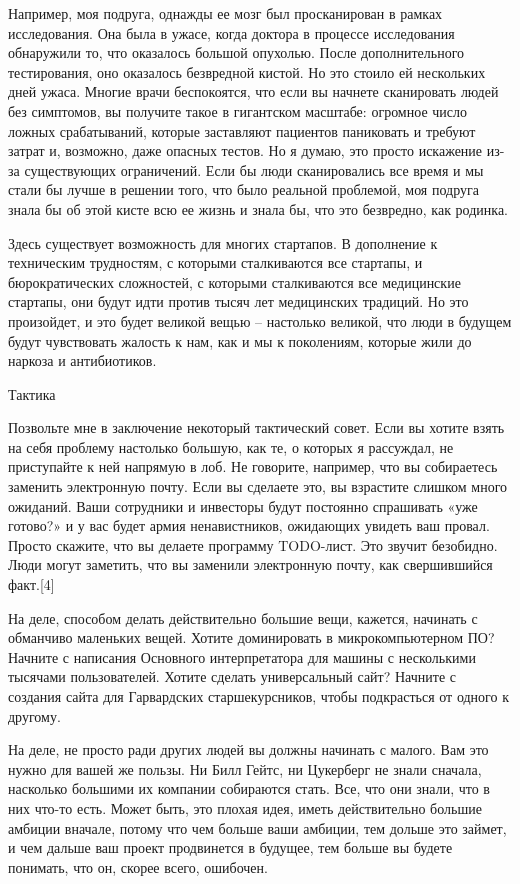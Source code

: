 \documentclass[ebook,12pt,oneside,openany]{memoir}
\begin{document}
Например, моя подруга, однажды ее мозг был просканирован в рамках
исследования. Она была в ужасе, когда доктора в процессе исследования
обнаружили то, что оказалось большой опухолью. После дополнительного
тестирования, оно оказалось безвредной кистой. Но это стоило ей
нескольких дней ужаса. Многие врачи беспокоятся, что если вы начнете
сканировать людей без симптомов, вы получите такое в гигантском
масштабе: огромное число ложных срабатываний, которые заставляют
пациентов паниковать и требуют затрат и, возможно, даже опасных
тестов. Но я думаю, это просто искажение из-за существующих
ограничений. Если бы люди сканировались все время и мы стали бы лучше
в решении того, что было реальной проблемой, моя подруга знала бы об
этой кисте всю ее жизнь и знала бы, что это безвредно, как родинка.

Здесь существует возможность для многих стартапов. В дополнение к
техническим трудностям, с которыми сталкиваются все стартапы, и
бюрократических сложностей, с которыми сталкиваются все медицинские
стартапы, они будут идти против тысяч лет медицинских традиций. Но это
произойдет, и это будет великой вещью – настолько великой, что люди в
будущем будут чувствовать жалость к нам, как и мы к поколениям,
которые жили до наркоза и антибиотиков.

Тактика

Позвольте мне в заключение некоторый тактический совет. Если вы хотите
взять на себя проблему настолько большую, как те, о которых я
рассуждал, не приступайте к ней напрямую в лоб. Не говорите, например,
что вы собираетесь заменить электронную почту. Если вы сделаете это,
вы взрастите слишком много ожиданий. Ваши сотрудники и инвесторы будут
постоянно спрашивать «уже готово?» и у вас будет армия ненавистников,
ожидающих увидеть ваш провал. Просто скажите, что вы делаете программу
TODO-лист. Это звучит безобидно. Люди могут заметить, что вы заменили
электронную почту, как свершившийся факт.[4]

На деле, способом делать действительно большие вещи, кажется, начинать
с обманчиво маленьких вещей. Хотите доминировать в микрокомпьютерном
ПО? Начните с написания Основного интерпретатора для машины с
несколькими тысячами пользователей. Хотите сделать универсальный сайт?
Начните с создания сайта для Гарвардских старшекурсников, чтобы
подкрасться от одного к другому.

На деле, не просто ради других людей вы должны начинать с малого. Вам
это нужно для вашей же пользы. Ни Билл Гейтс, ни Цукерберг не знали
сначала, насколько большими их компании собираются стать. Все, что они
знали, что в них что-то есть. Может быть, это плохая идея, иметь
действительно большие амбиции вначале, потому что чем больше ваши
амбиции, тем дольше это займет, и чем дальше ваш проект продвинется в
будущее, тем больше вы будете понимать, что он, скорее всего,
ошибочен.
\end{document}
